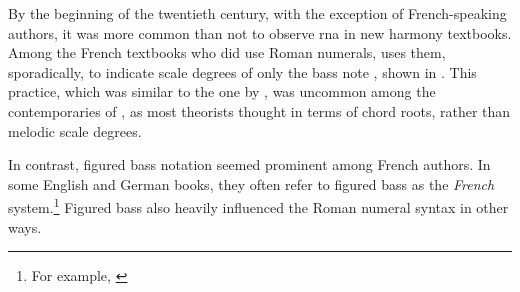 

By the beginning of the twentieth century, with the
exception of French-speaking authors, it was more common
than not to observe \gls{rna} in new harmony textbooks.
Among the French textbooks who did use Roman numerals,
\textcite{koechlin1928traite} uses them, sporadically, to
indicate scale degrees of only the bass note
\textcite{koechlin1928traite}, shown in
. This
practice, which was similar to the one by
\textcite{hamilton1840catechism}, was uncommon among the
contemporaries of \textcite{koechlin1928traite}, as most
theorists thought in terms of chord roots, rather than
melodic scale degrees.


In contrast, figured bass notation seemed prominent among
French authors. In some English and German books, they often
refer to figured bass as the \emph{French}
system.\footnote{For example,
\textcite{norris1894practical}} Figured bass also heavily
influenced the Roman numeral syntax in other ways.
